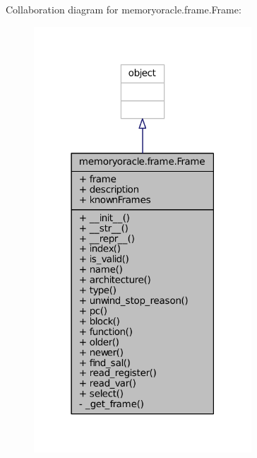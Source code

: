 Collaboration diagram for memoryoracle.\+frame.\+Frame\+:
\nopagebreak
\begin{figure}[H]
\begin{center}
\leavevmode
\includegraphics[width=231pt]{classmemoryoracle_1_1frame_1_1Frame__coll__graph}
\end{center}
\end{figure}
